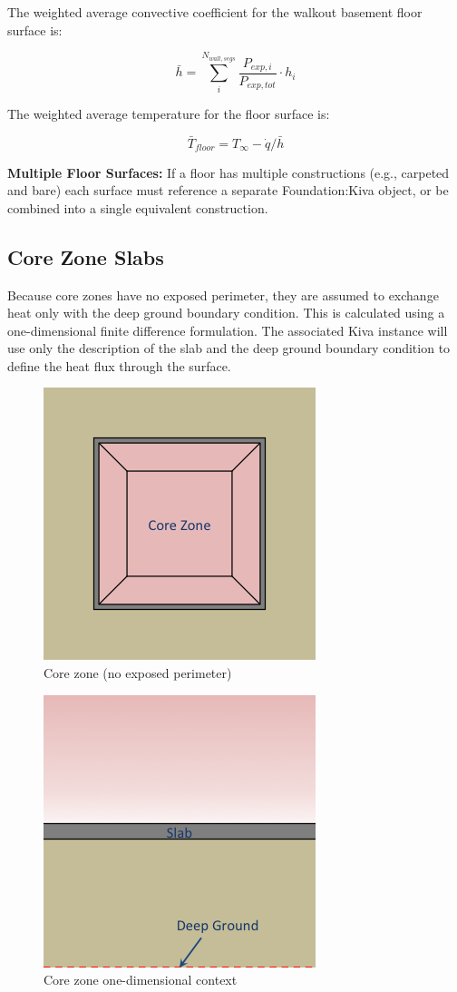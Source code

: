 The weighted average convective coefficient for the walkout basement
floor surface is:

\[\bar{h} = \sum^{N_{wall,segs}}_i{\frac{P_{exp,i}}{P_{exp,tot}}}\cdot h_i\]

The weighted average temperature for the floor surface is:

\[ \bar{T}_{floor} = T_\infty - \dot{q}/\bar{h} \]

\textbf{Multiple Floor Surfaces:} If a floor has multiple constructions
(e.g., carpeted and bare) each surface must reference a separate
Foundation:Kiva object, or be combined into a single equivalent
construction.

\subsection{Core Zone Slabs}\label{core-zone-slabs}

Because core zones have no exposed perimeter, they are assumed to
exchange heat only with the deep ground boundary condition. This is
calculated using a one-dimensional finite difference formulation. The
associated Kiva instance will use only the description of the slab and
the deep ground boundary condition to define the heat flux through the
surface.

\begin{figure}
\centering
\includegraphics{media/kiva-core-zone.png}
\caption{Core zone (no exposed perimeter)\label{fig:cz}}
\end{figure}

\begin{figure}
\centering
\includegraphics{media/kiva-core-zone-1d.png}
\caption{Core zone one-dimensional context\label{fig:cz-1}}
\end{figure}

